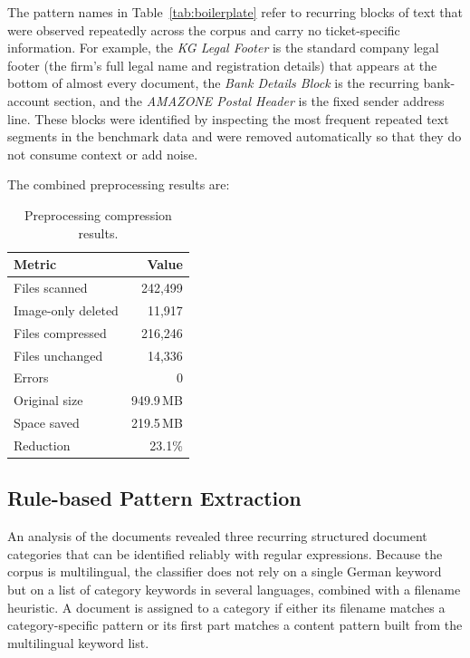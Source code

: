 \noindent
The pattern names in Table~\ref{tab:boilerplate} refer to recurring blocks of
text that were observed repeatedly across the corpus and carry no
ticket-specific information.  For example, the \emph{KG Legal Footer} is the
standard company legal footer (the firm's full legal name and registration
details) that appears at the bottom of almost every document, the \emph{Bank
Details Block} is the recurring bank-account section, and the \emph{AMAZONE
Postal Header} is the fixed sender address line.  These blocks were identified
by inspecting the most frequent repeated text segments in the benchmark data and
were removed automatically so that they do not consume context or add noise.

The combined preprocessing results are:

\begin{table}[H]
    \centering
    \caption{Preprocessing compression results.}
    \label{tab:compression}
    \begin{tabular}{lr}
        \hline
        \textbf{Metric} & \textbf{Value} \\
        \hline
        Files scanned        & 242,499 \\
        Image-only deleted   & 11,917 \\
        Files compressed     & 216,246 \\
        Files unchanged      & 14,336 \\
        Errors               & 0 \\
        \hline
        Original size        & 949.9\,MB \\
        Space saved          & 219.5\,MB \\
        Reduction            & 23.1\% \\
        \hline
    \end{tabular}
\end{table}

\subsection{Rule-based Pattern Extraction}
\label{subsec:regex}
%
An analysis of the documents revealed three recurring structured document
categories that can be identified reliably with regular expressions.  Because
the corpus is multilingual, the classifier does not rely on a single German
keyword but on a list of category keywords in several languages, combined with a
filename heuristic.  A document is assigned to a category if either its filename
matches a category-specific pattern or its first part matches a content pattern
built from the multilingual keyword list.

